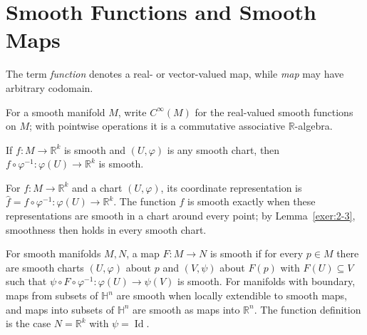 

\section{Smooth Functions and Smooth Maps}

\begin{remark}
\label{rem:2-8-extra-1}



The term \emph{function} denotes a real- or vector-valued map, while \emph{map} may have arbitrary codomain.
\end{remark}

\begin{notation}
\label{not:2-8-extra-3}



For a smooth manifold $M$, write $C^\infty(M)$ for the real-valued smooth
functions on $M$; with pointwise operations it is a commutative associative
$\mathbb R$-algebra.
\end{notation}


\begin{lemma}
\label{exer:2-3}




If $f:M\to\mathbb R^k$ is smooth and $(U,\varphi)$ is any smooth chart, then $f\circ\varphi^{-1}:\varphi(U)\to\mathbb R^k$ is smooth.
\end{lemma}

\begin{definition}
\label{def:2-8-extra-4}



For $f:M\to\mathbb R^k$ and a chart $(U,\varphi)$, its coordinate representation is $\widehat f=f\circ\varphi^{-1}:\varphi(U)\to\mathbb R^k$. The function $f$ is smooth exactly when these representations are smooth in a chart around every point; by Lemma~\ref{exer:2-3}, smoothness then holds in every smooth chart.
\end{definition}

\begin{definition}
\label{def:2-8-extra-5}



For smooth manifolds $M,N$, a map $F:M\to N$ is smooth if for every $p\in M$ there are smooth charts $(U,\varphi)$ about $p$ and $(V,\psi)$ about $F(p)$ with $F(U)\subseteq V$ such that $\psi\circ F\circ\varphi^{-1}:\varphi(U)\to\psi(V)$ is smooth. For manifolds with boundary, maps from subsets of $\mathbb H^n$ are smooth when locally extendible to smooth maps, and maps into subsets of $\mathbb H^n$ are smooth as maps into $\mathbb R^n$. The function definition is the case $N=\mathbb R^k$ with $\psi=\operatorname{Id}$.
\end{definition}

